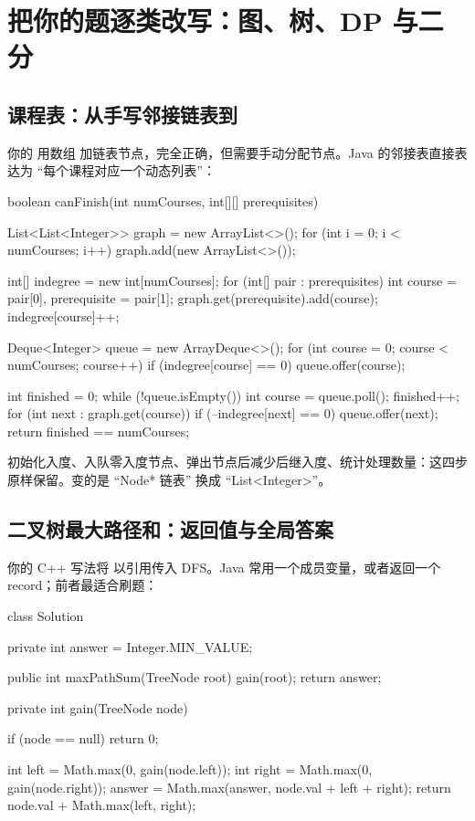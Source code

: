 \chapter{把你的题逐类改写：图、树、DP 与二分}

\section{课程表：从手写邻接链表到 }

你的  用数组  加链表节点，完全正确，但需要手动分配节点。Java 的邻接表直接表达为 ``每个课程对应一个动态列表''：

\begin{javacode}
boolean canFinish(int numCourses, int[][] prerequisites) {
    List<List<Integer>> graph = new ArrayList<>();
    for (int i = 0; i < numCourses; i++) graph.add(new ArrayList<>());

    int[] indegree = new int[numCourses];
    for (int[] pair : prerequisites) {
        int course = pair[0], prerequisite = pair[1];
        graph.get(prerequisite).add(course);
        indegree[course]++;
    }

    Deque<Integer> queue = new ArrayDeque<>();
    for (int course = 0; course < numCourses; course++) {
        if (indegree[course] == 0) queue.offer(course);
    }

    int finished = 0;
    while (!queue.isEmpty()) {
        int course = queue.poll();
        finished++;
        for (int next : graph.get(course)) {
            if (--indegree[next] == 0) queue.offer(next);
        }
    }
    return finished == numCourses;
}
\end{javacode}

\begin{transfer}[你原来的算法一行都没变]
初始化入度、入队零入度节点、弹出节点后减少后继入度、统计处理数量：这四步原样保留。变的是 ``Node* 链表'' 换成 ``List<Integer>''。
\end{transfer}

\section{二叉树最大路径和：返回值与全局答案}

你的 C++ 写法将  以引用传入 DFS。Java 常用一个成员变量，或者返回一个 record；前者最适合刷题：

\begin{javacode}
class Solution {
    private int answer = Integer.MIN_VALUE;

    public int maxPathSum(TreeNode root) {
        gain(root);
        return answer;
    }

    private int gain(TreeNode node) {
        if (node == null) return 0;

        int left = Math.max(0, gain(node.left));
        int right = Math.max(0, gain(node.right));
        answer = Math.max(answer, node.val + left + right);
        return node.val + Math.max(left, right);
    }
}
\end{javacode}

